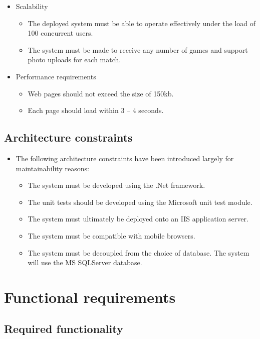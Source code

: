 \documentclass[11pt,a4paper]{article}
\begin{document}
\begin{itemize}
\item Scalability
	\begin{itemize}
	\item The deployed system must be able to operate effectively under the load of 100 concurrent users.
	\item The system must be made to receive any number of games and support photo uploads for each match.
	\end{itemize}
\end{itemize}
\begin{itemize}
\item Performance requirements
	\begin{itemize}
	\item Web pages should not exceed the size of 150kb.
	\item Each page should load within 3 – 4 seconds.
	\end{itemize}
\end{itemize}
\subsection{Architecture constraints}
	\begin{itemize}
		\item The following architecture constraints have been introduced largely for maintainability reasons:
			\begin{itemize}
				\item The system must be developed using the .Net framework.
				\item The unit tests should be developed using the Microsoft unit test module.
				\item The system must ultimately be deployed onto an IIS application server.
				\item The system must be compatible with mobile browsers.
				\item The system must be decoupled from the choice of database. The system will use the MS SQLServer database.
			\end{itemize}
	\end{itemize}
\section{Functional requirements}
\subsection{Required functionality}
\end{document}
